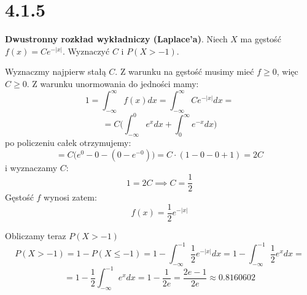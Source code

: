 \documentclass{article}
\begin{document}
\section*{4.1.5}
\begin{center}
    \textbf{Dwustronny rozkład wykładniczy (Laplace'a)}. Niech \(X\) ma gęstość \(f(x) = Ce^{-|x|}\).
    Wyznaczyć \(C\) i \(P(X > -1)\).
\end{center}
Wyznaczmy najpierw stałą \(C\). Z warunku na gęstość musimy mieć \(f \geq 0\), więc \(C \geq 0\). Z warunku unormowania do jedności mamy:
\begin{equation*}
    1 = \int_{-\infty}^{\infty} f(x)dx = \int_{-\infty}^{\infty} Ce^{-|x|} dx = 
\end{equation*}
\begin{equation*}
    = C \Big(\int_{-\infty}^{0} e^{x} dx + \int_{0}^{\infty} e^{-x} dx\Big)
\end{equation*}
po policzeniu całek otrzymujemy:
\begin{equation*}
    = C \Big(e^0 - 0 - (0 - e^{-0})\Big) = C \cdot (1 - 0 - 0 + 1) = 2C
\end{equation*}
i wyznaczamy \(C\):
\begin{equation*}
    1 = 2C \implies C = \frac{1}{2}
\end{equation*}
Gęstość \(f\) wynosi zatem:
\begin{equation*}
    f(x) = \frac{1}{2}e^{-|x|}
\end{equation*}
\par Obliczamy teraz \(P(X > -1)\)
\begin{equation*}
    P(X > -1) = 1 - P(X \leq -1) = 1 - \int_{-\infty}^{-1} \frac{1}{2}e^{-|x|} dx = 1 - \int_{-\infty}^{-1} \frac{1}{2}e^{x} dx = 
\end{equation*}
\begin{equation*}
    = 1 - \frac{1}{2} \int_{-\infty}^{-1} e^{x} dx = 1 - \frac{1}{2e} = \frac{2e - 1}{2e} \approx 0.8160602
\end{equation*}
\end{document}
